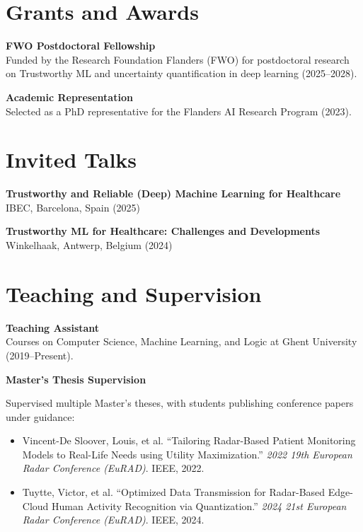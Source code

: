 \documentclass[10.5pt,a4paper]{article}
\newenvironment{cvsection}[1]{%
  \vspace{1.8em}%
  \begin{minipage}[t]{\textwidth}
  \vspace{0pt}%
  \titlespacing{\section}{0pt}{0pt}{0.7em}%
  \section{#1}%
}{%
  \end{minipage}%
  \titlespacing{\section}{0pt}{1.8em}{0.7em}%
}
\newcommand{\cvrow}[2]{%
  {\bfseries #1}\\
  {\small #2}
  \vspace{0.8em}
  \par
}
\begin{document}
\begin{cvsection}{Grants and Awards}

\cvrow{FWO Postdoctoral Fellowship}{Funded by the Research Foundation Flanders (FWO) for postdoctoral research on Trustworthy ML and uncertainty quantification in deep learning (2025--2028).}

\cvrow{Academic Representation}{Selected as a PhD representative for the Flanders AI Research Program (2023).}

\end{cvsection}

\begin{cvsection}{Invited Talks}

\cvrow{Trustworthy and Reliable (Deep) Machine Learning for Healthcare}{IBEC, Barcelona, Spain (2025)}

\cvrow{Trustworthy ML for Healthcare: Challenges and Developments}{Winkelhaak, Antwerp, Belgium (2024)}

\end{cvsection}

\begin{cvsection}{Teaching and Supervision}

\cvrow{Teaching Assistant}{Courses on Computer Science, Machine Learning, and Logic at Ghent University (2019--Present).}

\cvrow{Master's Thesis Supervision}{Supervised multiple Master's theses, with students publishing conference papers under guidance:
\begin{itemize}
\item Vincent-De Sloover, Louis, et al. ``Tailoring Radar-Based Patient Monitoring Models to Real-Life Needs using Utility Maximization.'' \textit{2022 19th European Radar Conference (EuRAD)}. IEEE, 2022.
\item Tuytte, Victor, et al. ``Optimized Data Transmission for Radar-Based Edge-Cloud Human Activity Recognition via Quantization.'' \textit{2024 21st European Radar Conference (EuRAD)}. IEEE, 2024.
\end{itemize}}

\end{cvsection}
\end{document}
